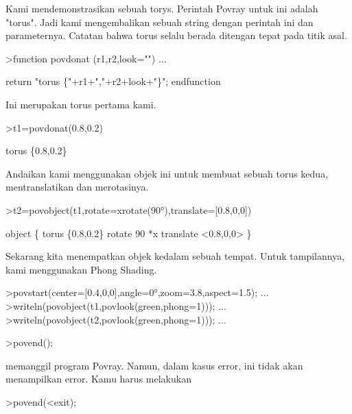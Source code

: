 \documentclass[a4paper,10pt]{article}
\begin{document}
\begin{eulernotebook}
\begin{eulercomment}
Kami mendemonstrasikan sebuah torys. Perintah Povray untuk ini adalah
"torus". Jadi kami mengembalikan sebuah string dengan perintah ini dan
parameternya. Catatan bahwa torus selalu berada ditengan tepat pada
titik asal.
\end{eulercomment}
\begin{eulerprompt}
>function povdonat (r1,r2,look="") ...
\end{eulerprompt}
\begin{eulerudf}
    return "torus \{"+r1+","+r2+look+"\}";
  endfunction
\end{eulerudf}
\begin{eulercomment}
Ini merupakan torus pertama kami.
\end{eulercomment}
\begin{eulerprompt}
>t1=povdonat(0.8,0.2)
\end{eulerprompt}
\begin{euleroutput}
  torus \{0.8,0.2\}
\end{euleroutput}
\begin{eulercomment}
Andaikan kami menggunakan objek ini untuk membuat sebuah torus kedua,
mentranslatikan dan merotasinya.
\end{eulercomment}
\begin{eulerprompt}
>t2=povobject(t1,rotate=xrotate(90°),translate=[0.8,0,0])
\end{eulerprompt}
\begin{euleroutput}
  object \{ torus \{0.8,0.2\}
   rotate 90 *x 
   translate <0.8,0,0>
   \}
\end{euleroutput}
\begin{eulercomment}
Sekarang kita menempatkan objek kedalam sebuah tempat. Untuk
tampilannya, kami menggunakan Phong Shading.
\end{eulercomment}
\begin{eulerprompt}
>povstart(center=[0.4,0,0],angle=0°,zoom=3.8,aspect=1.5); ...
>writeln(povobject(t1,povlook(green,phong=1))); ...
>writeln(povobject(t2,povlook(green,phong=1))); ...
\end{eulerprompt}
\begin{eulerttcomment}
 >povend();
\end{eulerttcomment}
\begin{eulercomment}
memanggil program Povray. Namun, dalam kasus error, ini tidak akan
menampilkan error. Kamu harus melakukan

\end{eulercomment}
\begin{eulerttcomment}
 >povend(<exit);
\end{eulerttcomment}
\begin{eulercomment}


\end{eulercomment}
\end{eulernotebook}
\end{document}
